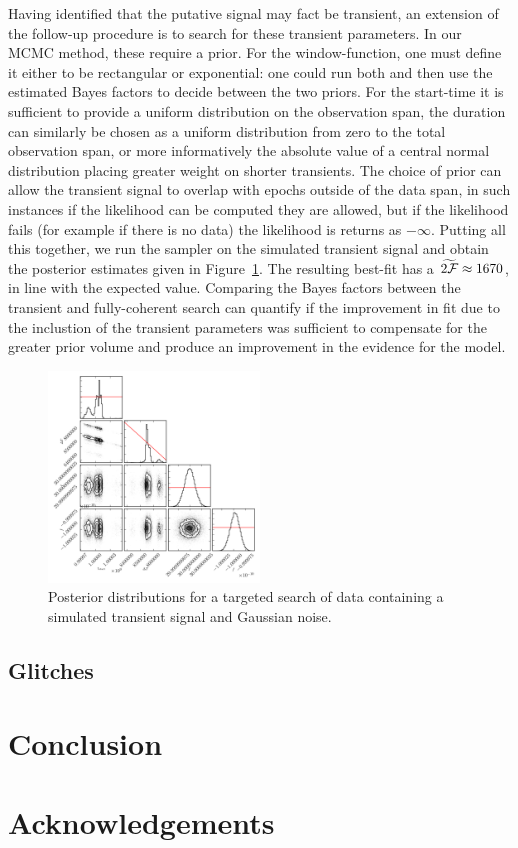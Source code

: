 \documentclass[aps, prd, twocolumn, superscriptaddress, floatfix, showpacs, nofootinbib, longbibliography]{revtex4-1}
\begin{document}
Having identified that the putative signal may fact be transient, an extension
of the follow-up procedure is to search for these transient parameters. In our
MCMC method, these require a prior. For the window-function, one must define it
either to be rectangular or exponential: one could run both and then use the
estimated Bayes factors to decide between the two priors. For the start-time it
is sufficient to provide a uniform distribution on the observation span, the
duration can similarly be chosen as a uniform distribution from zero to the
total observation span, or more informatively the absolute value of a central
normal distribution placing greater weight on shorter transients. The choice of
prior can allow the transient signal to overlap with epochs outside of the data
span, in such instances if the likelihood can be computed they are allowed, but
if the likelihood fails (for example if there is no data) the likelihood is
returns as $-\infty$. Putting all this together, we run the sampler on the
simulated transient signal and obtain the posterior estimates given in
Figure~\ref{fig_transient_posterior}. The resulting best-fit has a
$\widetilde{2{\mathcal{F}}}\approx 1670$, in line with the expected value. Comparing the
Bayes factors between the transient and fully-coherent search can quantify if
the improvement in fit due to the inclustion of the transient parameters was
sufficient to compensate for the greater prior volume and produce an
improvement in the evidence for the model.

\begin{figure}[htb]
\centering
\includegraphics[width=0.5\textwidth]{transient_search_corner}
\caption{Posterior distributions for a targeted search of data containing
a simulated transient signal and Gaussian noise.}
\label{fig_transient_posterior}
\end{figure}



\subsection{Glitches}
\label{sec_glitches}

\section{Conclusion}
\label{sec_conclusion}



\section{Acknowledgements}


\end{document}
